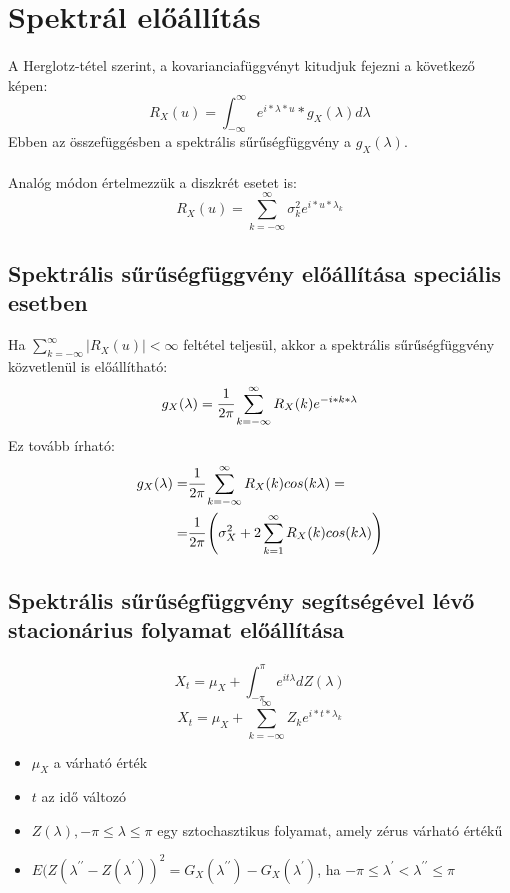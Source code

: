 \documentclass[11pt,a4pape,draftr]{article}
\begin{document}
		\section{Spektrál előállítás}
			\paragraph{}
				A Herglotz-tétel szerint, a kovarianciafüggvényt kitudjuk fejezni a következő képen:
				$$R_X (u)=\int_{-\infty}^\infty e^{i*\lambda*u}*g_X(\lambda)d\lambda$$
				Ebben az összefüggésben a spektrális sűrűségfüggvény a $g_X(\lambda)$.
			\paragraph{}
				Analóg módon értelmezzük a diszkrét esetet is:
				$$R_X(u) = \sum_{k = - \infty}^\infty \sigma^2_k e^{i*u* \lambda_k}$$
			\subsection{Spektrális sűrűségfüggvény előállítása speciális esetben}
				Ha $\sum_{k=- \infty}^{\infty}|R_X(u)| < \infty$ feltétel teljesül, akkor a spektrális sűrűségfüggvény közvetlenül is előállítható:
				$$g_X(\lambda) = \cfrac{1}{2 \pi} \sum_{k = - \infty} ^{\infty} R_X(k) e^{-i * k *\lambda}$$
				Ez tovább írható:
				$$
				\begin{aligned}
					g_X(\lambda) =& \cfrac{1}{ 2  \pi} \sum_{k = - \infty}^{\infty}R_X(k)cos(k \lambda) = \\
					=& \cfrac{1}{2 \pi} \left( \sigma_X^2 + 2 \sum_{k = 1}^{\infty} R_X(k) cos(k \lambda) \right)
				\end{aligned}$$
			\subsection{Spektrális sűrűségfüggvény segítségével lévő stacionárius folyamat előállítása}
				\paragraph{}
					$$X_t = \mu_X + \int_{- \pi} ^\pi e^{it\lambda} d Z(\lambda)$$
					$$X_t = \mu_X + \sum_{k=-\infty}^{\infty}Z_ke^{i*t*\lambda_k}$$
					\begin{itemize}
						\item $\mu_X$ a várható érték
						\item $t$ az idő változó
						\item $Z(\lambda), -\pi \le \lambda \le \pi$ egy sztochasztikus folyamat, amely zérus várható értékű
						\item $E(Z(\lambda^{\prime\prime} - Z(\lambda^{\prime}))^2 = G_X(\lambda^{\prime \prime}) -G_X(\lambda^{\prime})$, ha $-\pi \le \lambda^{\prime} < \lambda^{\prime \prime} \le \pi$ 
					\end{itemize}
\end{document}
